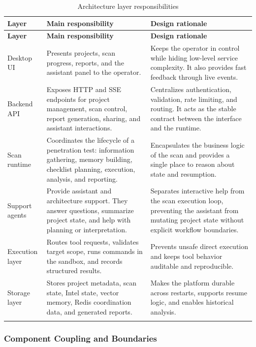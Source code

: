 \documentclass[12pt,a4paper]{report}
\begin{document}
\begin{longtable}{|p{}|p{}|p{}|}
\hline
\textbf{Layer} & \textbf{Main responsibility} & \textbf{Design rationale} \\
\hline
\endfirsthead
\hline
\textbf{Layer} & \textbf{Main responsibility} & \textbf{Design rationale} \\
\hline
\endhead
Desktop UI & Presents projects, scan progress, reports, and the assistant panel to
the operator. & Keeps the operator in control while hiding low-level service
complexity. It also provides fast feedback through live events. \\
\hline
Backend API & Exposes HTTP and SSE endpoints for project management, scan control,
report generation, sharing, and assistant interactions. & Centralizes authentication,
validation, rate limiting, and routing. It acts as the stable contract between the
interface and the runtime. \\
\hline
Scan runtime & Coordinates the lifecycle of a penetration test: information gathering,
memory building, checklist planning, execution, analysis, and reporting. & Encapsulates
the business logic of the scan and provides a single place to reason about state and
resumption. \\
\hline
Support agents & Provide assistant and architecture support. They answer questions,
summarize project state, and help with planning or interpretation. & Separates
interactive help from the scan execution loop, preventing the assistant from mutating
project state without explicit workflow boundaries. \\
\hline
Execution layer & Routes tool requests, validates target scope, runs commands in the
sandbox, and records structured results. & Prevents unsafe direct execution and keeps
tool behavior auditable and reproducible. \\
\hline
Storage layer & Stores project metadata, scan state, Intel state, vector memory, Redis
coordination data, and generated reports. & Makes the platform durable across restarts,
supports resume logic, and enables historical analysis. \\
\hline
\caption{Architecture layer responsibilities}
\label{tab:architecture_responsibilities}
\end{longtable}

\subsubsection{Component Coupling and Boundaries}
\end{document}
